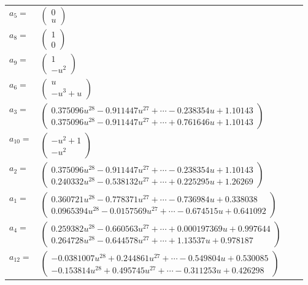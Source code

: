 \documentclass[1p]{elsarticle_modified}
\theoremstyle{definition}
\begin{document}
\begin{tabular}{m{7pt} m{180pt} m{7pt} m{180pt} }
\flushright $a_{5}=$&$\begin{pmatrix}0\\u\end{pmatrix}$ \\
\flushright $a_{8}=$&$\begin{pmatrix}1\\0\end{pmatrix}$ \\
\flushright $a_{9}=$&$\begin{pmatrix}1\\- u^2\end{pmatrix}$ \\
\flushright $a_{6}=$&$\begin{pmatrix}u\\- u^3+u\end{pmatrix}$ \\
\flushright $a_{3}=$&$\begin{pmatrix}0.375096 u^{28}-0.911447 u^{27}+\cdots-0.238354 u+1.10143\\0.375096 u^{28}-0.911447 u^{27}+\cdots+0.761646 u+1.10143\end{pmatrix}$ \\
\flushright $a_{10}=$&$\begin{pmatrix}- u^2+1\\- u^2\end{pmatrix}$ \\
\flushright $a_{2}=$&$\begin{pmatrix}0.375096 u^{28}-0.911447 u^{27}+\cdots-0.238354 u+1.10143\\0.240332 u^{28}-0.538132 u^{27}+\cdots+0.225295 u+1.26269\end{pmatrix}$ \\
\flushright $a_{1}=$&$\begin{pmatrix}0.360721 u^{28}-0.778371 u^{27}+\cdots-0.736984 u+0.338038\\0.0965394 u^{28}-0.0157569 u^{27}+\cdots-0.674515 u+0.641092\end{pmatrix}$ \\
\flushright $a_{4}=$&$\begin{pmatrix}0.259382 u^{28}-0.660563 u^{27}+\cdots+0.000197369 u+0.997644\\0.264728 u^{28}-0.644578 u^{27}+\cdots+1.13537 u+0.978187\end{pmatrix}$ \\
\flushright $a_{12}=$&$\begin{pmatrix}-0.0381007 u^{28}+0.244861 u^{27}+\cdots-0.549804 u+0.530085\\-0.153814 u^{28}+0.495745 u^{27}+\cdots-0.311253 u+0.426298\end{pmatrix}$ \\

\end{tabular}
\end{document}

